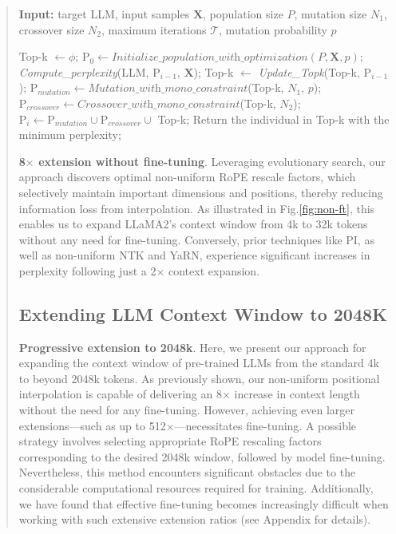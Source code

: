 \begin{abstract}
\begin{algorithm}[t]
	\small
	\caption{The search algorithm}
	\textbf{Input:} target LLM, input samples $\mathbf{X}$, population size $P$, mutation size $N_1$, crossover size $N_2$, maximum iterations $\mathcal{T}$, mutation probability $p$\\

	\begin{algorithmic}[1]
		\label{alg:search}
		\STATE Top-k $\gets \phi$;	
		\STATE $\text{P}_0 \gets \textit{Initialize\_population\_with\_optimization}(P, \mathbf{X}, p)$; 
		\STATE \textit{Compute\_perplexity}(LLM, $\text{P}_{i-1}$, $\mathbf{X}$);
		\STATE Top-k $\gets$ \textit{Update\_Topk}(Top-k, $\text{P}_{i-1}$);
		\STATE $\text{P}_{mutation} \gets \textit{Mutation\_with\_mono\_constraint}$(Top-k, $N_1$, $p$); 
		\STATE $\text{P}_{crossover} \gets \textit{Crossover\_with\_mono\_constraint}$(Top-k, $N_2$);
		\STATE $\text{P}_i \gets \text{P}_{mutation} \cup \text{P}_{crossover} \cup$ Top-k;
		\ENDFOR
		\STATE Return the individual in Top-k with the minimum perplexity;
	\end{algorithmic}
\end{algorithm}

\textbf{8$\times$ extension without fine-tuning}. Leveraging evolutionary search, our approach discovers optimal non-uniform RoPE rescale factors, which selectively maintain important dimensions and positions, thereby reducing information loss from interpolation. As illustrated in Fig.\ref{fig:non-ft}, this enables us to expand LLaMA2's context window from 4k to 32k tokens without any need for fine-tuning. Conversely, prior techniques like PI, as well as non-uniform NTK and YaRN, experience significant increases in perplexity following just a 2$\times$ context expansion.

\subsection{Extending LLM Context Window to 2048K}
\label{sec:extendto2048k}

\textbf{Progressive extension to 2048k}. Here, we present our approach for expanding the context window of pre-trained LLMs from the standard 4k to beyond 2048k tokens. As previously shown, our non-uniform positional interpolation is capable of delivering an 8$\times$ increase in context length without the need for any fine-tuning. However, achieving even larger extensions—such as up to 512$\times$—necessitates fine-tuning. A possible strategy involves selecting appropriate RoPE rescaling factors corresponding to the desired 2048k window, followed by model fine-tuning. Nevertheless, this method encounters significant obstacles due to the considerable computational resources required for training. Additionally, we have found that effective fine-tuning becomes increasingly difficult when working with such extensive extension ratios (see Appendix for details).


\end{abstract}
